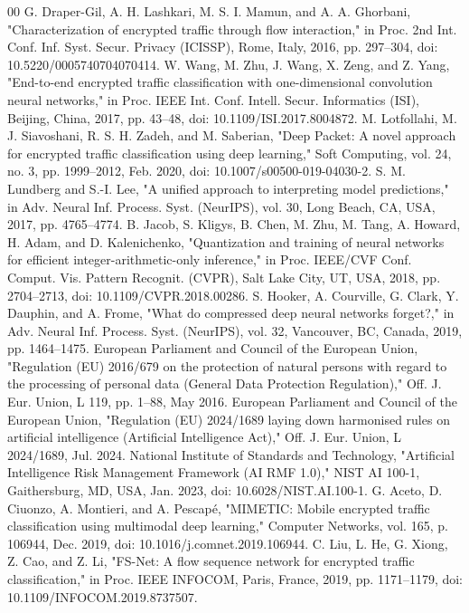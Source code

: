 \documentclass[conference]{IEEEtran}
\begin{document}
\begin{thebibliography}{00}
 G. Draper-Gil, A. H. Lashkari, M. S. I. Mamun, and A. A. Ghorbani, "Characterization of encrypted traffic through flow interaction," in Proc. 2nd Int. Conf. Inf. Syst. Secur. Privacy (ICISSP), Rome, Italy, 2016, pp. 297–304, doi: 10.5220/0005740704070414.
 W. Wang, M. Zhu, J. Wang, X. Zeng, and Z. Yang, "End-to-end encrypted traffic classification with one-dimensional convolution neural networks," in Proc. IEEE Int. Conf. Intell. Secur. Informatics (ISI), Beijing, China, 2017, pp. 43–48, doi: 10.1109/ISI.2017.8004872.
 M. Lotfollahi, M. J. Siavoshani, R. S. H. Zadeh, and M. Saberian, "Deep Packet: A novel approach for encrypted traffic classification using deep learning," Soft Computing, vol. 24, no. 3, pp. 1999–2012, Feb. 2020, doi: 10.1007/s00500-019-04030-2.
 S. M. Lundberg and S.-I. Lee, "A unified approach to interpreting model predictions," in Adv. Neural Inf. Process. Syst. (NeurIPS), vol. 30, Long Beach, CA, USA, 2017, pp. 4765–4774.
 B. Jacob, S. Kligys, B. Chen, M. Zhu, M. Tang, A. Howard, H. Adam, and D. Kalenichenko, "Quantization and training of neural networks for efficient integer-arithmetic-only inference," in Proc. IEEE/CVF Conf. Comput. Vis. Pattern Recognit. (CVPR), Salt Lake City, UT, USA, 2018, pp. 2704–2713, doi: 10.1109/CVPR.2018.00286.
 S. Hooker, A. Courville, G. Clark, Y. Dauphin, and A. Frome, "What do compressed deep neural networks forget?," in Adv. Neural Inf. Process. Syst. (NeurIPS), vol. 32, Vancouver, BC, Canada, 2019, pp. 1464–1475.
 European Parliament and Council of the European Union, "Regulation (EU) 2016/679 on the protection of natural persons with regard to the processing of personal data (General Data Protection Regulation)," Off. J. Eur. Union, L 119, pp. 1–88, May 2016.
 European Parliament and Council of the European Union, "Regulation (EU) 2024/1689 laying down harmonised rules on artificial intelligence (Artificial Intelligence Act)," Off. J. Eur. Union, L 2024/1689, Jul. 2024.
 National Institute of Standards and Technology, "Artificial Intelligence Risk Management Framework (AI RMF 1.0)," NIST AI 100-1, Gaithersburg, MD, USA, Jan. 2023, doi: 10.6028/NIST.AI.100-1.
 G. Aceto, D. Ciuonzo, A. Montieri, and A. Pescapé, "MIMETIC: Mobile encrypted traffic classification using multimodal deep learning," Computer Networks, vol. 165, p. 106944, Dec. 2019, doi: 10.1016/j.comnet.2019.106944.
 C. Liu, L. He, G. Xiong, Z. Cao, and Z. Li, "FS-Net: A flow sequence network for encrypted traffic classification," in Proc. IEEE INFOCOM, Paris, France, 2019, pp. 1171–1179, doi: 10.1109/INFOCOM.2019.8737507.

\end{thebibliography}
\end{document}

